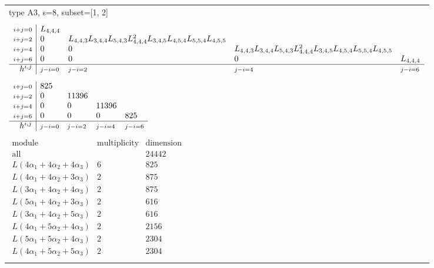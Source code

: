 \documentclass[crop,border=2mm]{standalone}
\begin{document}
\begin{tabular}{l}
{\huge type A3, s=8, subset=[1, 2]}\\ \\


$\displaystyle
\begin{array}{r|l l l l}
	{\scriptstyle i+j=0}&L_{4,4,4}&&&\\
	{\scriptstyle i+j=2}&0&L_{4,4,3}L_{3,4,4}L_{5,4,3}L_{4,4,4}^{2}L_{3,4,5}L_{4,5,4}L_{5,5,4}L_{4,5,5}&&\\
	{\scriptstyle i+j=4}&0&0&L_{4,4,3}L_{3,4,4}L_{5,4,3}L_{4,4,4}^{2}L_{3,4,5}L_{4,5,4}L_{5,5,4}L_{4,5,5}&\\
	{\scriptstyle i+j=6}&0&0&0&L_{4,4,4}\\
	\hline h^{i,j}&{\scriptstyle j-i=0}&{\scriptstyle j-i=2}&{\scriptstyle j-i=4}&{\scriptstyle j-i=6}
\end{array}
$ \\ \\


$\displaystyle
\begin{array}{r|l l l l}
	{\scriptstyle i+j=0}&825&&&\\
	{\scriptstyle i+j=2}&0&11396&&\\
	{\scriptstyle i+j=4}&0&0&11396&\\
	{\scriptstyle i+j=6}&0&0&0&825\\
	\hline h^{i,j}&{\scriptstyle j-i=0}&{\scriptstyle j-i=2}&{\scriptstyle j-i=4}&{\scriptstyle j-i=6}
\end{array}
$ \\ \\


$\displaystyle
\begin{array}{rll}
	\text{module}&\text{multiplicity}&\text{dimension} \\ \hline \text{all}&&24442 \\
	L\left( 4\alpha_{1}+ 4\alpha_{2}+ 4\alpha_{3}\right)&6&825\\
	L\left( 4\alpha_{1}+ 4\alpha_{2}+ 3\alpha_{3}\right)&2&875\\
	L\left( 3\alpha_{1}+ 4\alpha_{2}+ 4\alpha_{3}\right)&2&875\\
	L\left( 5\alpha_{1}+ 4\alpha_{2}+ 3\alpha_{3}\right)&2&616\\
	L\left( 3\alpha_{1}+ 4\alpha_{2}+ 5\alpha_{3}\right)&2&616\\
	L\left( 4\alpha_{1}+ 5\alpha_{2}+ 4\alpha_{3}\right)&2&2156\\
	L\left( 5\alpha_{1}+ 5\alpha_{2}+ 4\alpha_{3}\right)&2&2304\\
	L\left( 4\alpha_{1}+ 5\alpha_{2}+ 5\alpha_{3}\right)&2&2304
\end{array}
$ \\ \\

\end{tabular}
\end{document}
